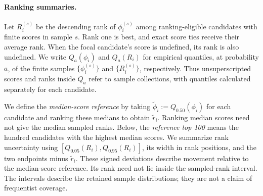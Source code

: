\documentclass[11pt]{article}
\newcommand{\fit}{\phi}
\begin{document}
\paragraph{Ranking summaries.}
Let $R_i^{(s)}$ be the descending rank of $\fit_i^{(s)}$ among
ranking-eligible candidates with finite scores in sample $s$. Rank one is
best, and exact score ties receive their average rank. When the focal
candidate's score is undefined, its rank is also undefined. We write
$Q_a(\fit_i)$ and $Q_a(R_i)$ for empirical quantiles, at probability $a$, of
the finite samples $\{\fit_i^{(s)}\}$ and $\{R_i^{(s)}\}$, respectively.
Thus unsuperscripted scores and ranks inside $Q_a$ refer to sample collections,
with quantiles calculated separately for each candidate.

We define the \emph{median-score reference} by taking
$\widetilde\fit_i:=Q_{0.50}(\fit_i)$ for each candidate and ranking these
medians to obtain $\widetilde r_i$. Ranking median scores need not give
the median sampled ranks. Below, the \emph{reference top 100} means the
hundred candidates with the highest median scores. We summarize rank uncertainty using
$[Q_{0.05}(R_i),Q_{0.95}(R_i)]$, its width in rank positions, and the two
endpoints minus $\widetilde r_i$. These signed deviations describe movement
relative to the median-score reference. Its rank need not lie inside the
sampled-rank interval. The intervals describe the retained sample distributions;
they are not a claim of frequentist coverage.
\end{document}
